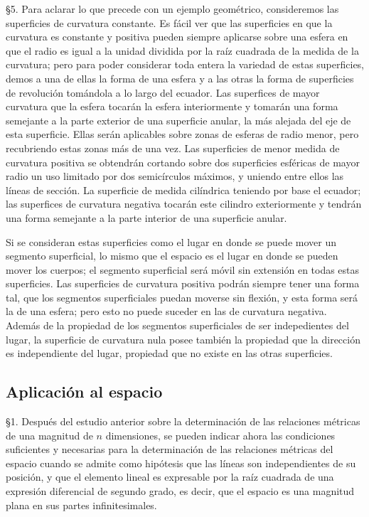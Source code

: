 \documentclass[a4paper, 12pt]{article}
\begin{document}
\S 5. \hspace{3 mm}  Para aclarar lo que precede con un ejemplo geométrico, consideremos las superficies de curvatura constante. Es fácil ver que las superficies en que la curvatura es constante y positiva pueden siempre aplicarse sobre una esfera en que el radio es igual a la unidad dividida por la raíz cuadrada de la medida de la curvatura; pero para poder considerar toda entera la variedad de estas superficies, demos a una de ellas la forma de una esfera y  a las otras la forma de superficies de revolución tomándola a lo largo del ecuador. Las superfices de mayor curvatura que la esfera tocarán la esfera interiormente y tomarán una forma semejante a la parte exterior de una superficie anular, la más alejada del eje de esta superficie. Ellas serán aplicables sobre zonas de esferas de radio menor, pero recubriendo estas zonas más de una vez. Las superficies de menor medida de curvatura positiva se obtendrán cortando sobre dos superficies esféricas de mayor radio un uso limitado por dos semicírculos máximos, y uniendo entre ellos las líneas de sección. La superficie de medida cilíndrica teniendo por base el ecuador; las superfices de curvatura negativa tocarán este cilindro exteriormente y tendrán una forma semejante a la parte interior de una superficie anular.
   
Si se consideran estas superficies como el lugar en donde se puede mover un segmento superficial, lo mismo que el espacio es el lugar en donde se pueden mover los cuerpos; el segmento superficial será móvil sin extensión en todas estas superficies. Las superficies de curvatura positiva podrán siempre tener una forma tal, que los segmentos superficiales puedan moverse sin
flexión, y esta forma será la de una esfera; pero esto no puede suceder en las de curvatura negativa. Además de la propiedad de los segmentos superficiales de ser indepedientes del lugar, la
superficie de curvatura nula posee también la propiedad que la dirección es independiente del lugar, \enlargethispage{\baselineskip} propiedad que no existe en las otras superficies.


\subsection*{Aplicación al espacio}


\S 1.\hspace{3 mm} Después del estudio anterior sobre la determinación de las relaciones métricas de una magnitud de $n$ dimensiones, se pueden indicar ahora las condiciones suficientes y necesarias para la determinación de las relaciones métricas del espacio cuando se admite como hipótesis que las líneas son independientes de su posición, y que el elemento lineal es expresable por la raíz cuadrada de una expresión diferencial de segundo grado, es decir, que el espacio es una magnitud plana en sus partes infinitesimales.
\end{document}
